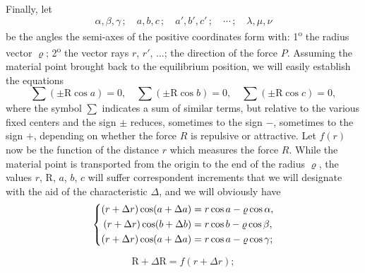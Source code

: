 \documentclass[leqno,openright,smallroyalvopaper,8pt,twoside,showtrims]{memoir}
\begin{document}
Finally, let
\begin{equation*}
\alpha,\beta,\gamma\,; \quad a,b,c\,;\quad a',b',c'\,;\quad \cdots\,;\quad \lambda,\mu,\nu
\end{equation*}
be the angles the semi-axes of the positive coordinates form with: 1\textsuperscript{o} the radius vector $\varrho$; 2\textsuperscript{o} the vector rays $r$, $r'$, ...; the direction of the force $P$. Assuming the material point brought back to the equilibrium position, we will easily establish the equations
\begin{equation}
\textstyle\sum(\pm\text{R}\cos a)=0,\quad \textstyle\sum(\pm\text{R}\cos b)=0,\quad\textstyle\sum(\pm\text{R}\cos c)=0,
\end{equation}
where the symbol $\sum$ indicates a sum of similar terms, but relative to the various fixed centers and the sign $\pm$ reduces, sometimes to the sign $-$, sometimes to the sign $+$, depending on whether the force $R$ is repulsive or attractive. Let $f(r)$ now be the function of the distance $r$ which measures the force $R$. While the material point is transported from the origin to the end of the radius $\varrho$, the values $r$, $\text{R}$, $a$, $b$, $c$  will suffer correspondent increments that we will designate with the aid of the characteristic $\Delta$, and we will obviously have
\begin{equation}
\begin{dcases}
\begin{aligned}
(r+\Delta r)\cos(a+\Delta a)&=r\cos a-\varrho\cos\alpha,\\
(r+\Delta r)\cos(b+\Delta b)&=r\cos b-\varrho\cos\beta,\\
(r+\Delta r)\cos(a+\Delta a)&=r\cos a-\varrho\cos\gamma;
\end{aligned}
\end{dcases}
\end{equation}

\begin{equation}
\text{R}+\Delta \text{R} = f(r+\Delta r);
\end{equation}
\end{document}
